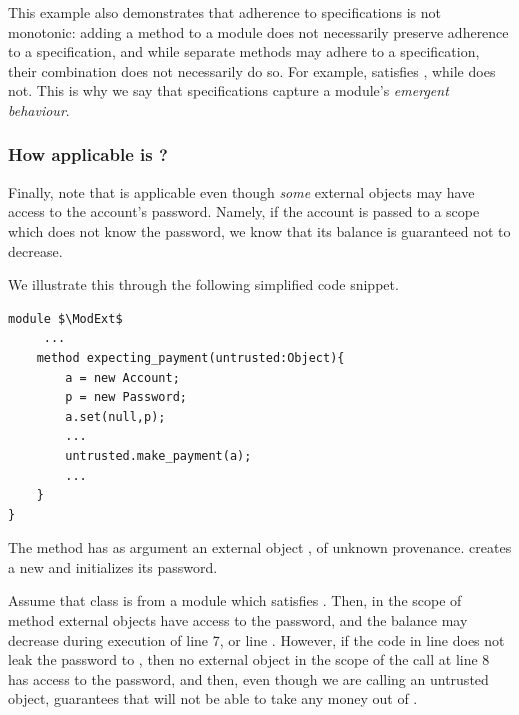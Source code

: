  This example also demonstrates that 
adherence to   \Nec specifications is not monotonic:
adding a method to a module does not necessarily preserve adherence to
a specification, 
and while separate methods may adhere to a  specification, their combination does
not necessarily do so. 
{For example, \ModA satisfies \SrobustB, while \ModB does not.}
This is why we say that \Nec   specifications capture a module's \emph{emergent behaviour}. 
 

\subsubsection{How applicable is  \SrobustB?}
\label{sec:how}
Finally,  {note that \SrobustB is applicable even though \emph{some} external objects may have access
to the account's password. 
Namely, if the account is passed to a scope which does not know the password, we 
know that its balance is guaranteed not to decrease. %
}

 
We illustrate this through the following simplified code snippet.
 

\begin{lstlisting}[mathescape=true, language=chainmail, frame=lines]
module $\ModExt$
     ...
    method expecting_payment(untrusted:Object){ 
        a = new Account;
        p = new Password; 
        a.set(null,p);
        ...
        untrusted.make_payment(a);
        ...
    }
}
\end{lstlisting}
 

 The method  has as  argument an external object , of unknown provenance.
 creates a new  and initializes its password. 

Assume that class  is from a module which satisfies \SrobustB. 
Then, 
in the scope of  method  external objects have access to the password, 
and the balance may decrease  
during execution of  line 7, or   line . 
However, if the code in line  does not leak the password to , then no external object
in  the scope of the call  at line 8 has access to the password, and then,
even though we are calling   an untrusted object, \SrobustB guarantees that 
 will not be able to take any money out of  .
 

